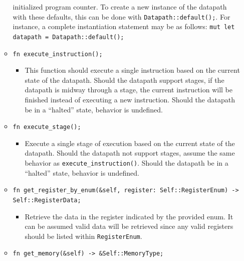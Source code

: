 \documentclass[
    paper=letter,
    parskip=half,
    fontsize=12pt,
    titlepage=firstiscover,
    toc=bibliography,
    numbers=endperiod
]{scrartcl}
\providecommand{\tightlist}{%
  \setlength{\itemsep}{0pt}\setlength{\parskip}{0pt}}
\begin{document}
\begin{itemize}
\begin{itemize}
                    initialized program counter. To create a new instance of the datapath
                    with these defaults, this can be done with
                    \texttt{Datapath::default();}. For instance, a complete instantiation
                    statement may be as follows: \texttt{mut let datapath =
                        Datapath::default();}
              \item \texttt{fn execute\_instruction();}
                    \begin{itemize}
                        \tightlist
                        \item This function should execute a single instruction based on the current
                              state of the datapath. Should the datapath support stages, if the
                              datapath is midway through a stage, the current instruction will be
                              finished instead of executing a new instruction. Should the datapath be
                              in a ``halted'' state, behavior is undefined.
                    \end{itemize}
              \item \texttt{fn execute\_stage();}
                    \begin{itemize}
                        \tightlist
                        \item Execute a single stage of execution based on the current state of the
                              datapath. Should the datapath not support stages, assume the same
                              behavior as \texttt{execute\_instruction()}. Should the datapath be in a
                              ``halted'' state, behavior is undefined.
                    \end{itemize}
              \item \texttt{fn get\_register\_by\_enum(\&self, register: Self::RegisterEnum) -\textgreater{} Self::RegisterData;}
                    \begin{itemize}
                        \tightlist
                        \item Retrieve the data in the register indicated by the provided enum. It can
                              be assumed valid data will be retrieved since any valid registers should
                              be listed within \texttt{RegisterEnum}.
                    \end{itemize}
              \item \texttt{fn get\_memory(\&self) -\textgreater{} \&Self::MemoryType;}

\end{itemize}
\end{itemize}
\end{document}
